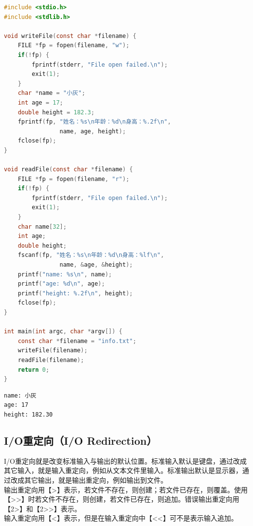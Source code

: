\begin{lstlisting}[language=C]
#include <stdio.h>
#include <stdlib.h>

void writeFile(const char *filename) {
    FILE *fp = fopen(filename, "w");
    if(!fp) {
        fprintf(stderr, "File open failed.\n");
        exit(1);
    }
    char *name = "小灰";
    int age = 17;
    double height = 182.3;
    fprintf(fp, "姓名：%s\n年龄：%d\n身高：%.2f\n", 
                name, age, height);
    fclose(fp);
}

void readFile(const char *filename) {
    FILE *fp = fopen(filename, "r");
    if(!fp) {
        fprintf(stderr, "File open failed.\n");
        exit(1);
    }
    char name[32];
    int age;
    double height;
    fscanf(fp, "姓名：%s\n年龄：%d\n身高：%lf\n", 
                name, &age, &height);
    printf("name: %s\n", name);
    printf("age: %d\n", age);
    printf("height: %.2f\n", height);
    fclose(fp);
}

int main(int argc, char *argv[]) {
    const char *filename = "info.txt";
    writeFile(filename);
    readFile(filename);
    return 0;
}
\end{lstlisting}

\begin{tcolorbox}
	\begin{verbatim}
name: 小灰
age: 17
height: 182.30
	\end{verbatim}
\end{tcolorbox}

\vspace{0.5cm}

\subsection{I/O重定向（I/O Redirection）}

I/O重定向就是改变标准输入与输出的默认位置。标准输入默认是键盘，通过改成其它输入，就是输入重定向，例如从文本文件里输入。标准输出默认是显示器，通过改成其它输出，就是输出重定向，例如输出到文件。\\

输出重定向用【>】表示，若文件不存在，则创建；若文件已存在，则覆盖。使用【>>】时若文件不存在，则创建，若文件已存在，则追加。错误输出重定向用【2>】和【2>>】表示。\\

输入重定向用【<】表示，但是在输入重定向中【<<】可不是表示输入追加。\\


